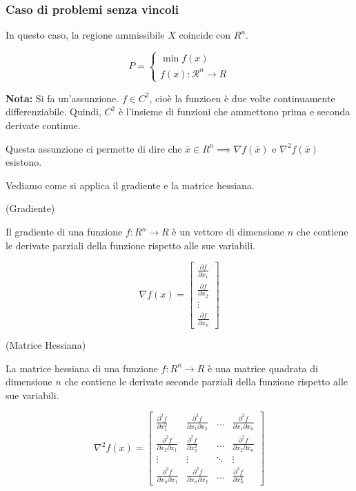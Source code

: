 \subsubsection{Caso di problemi senza vincoli}

In questo caso, la regione ammissibile $X$ coincide con $R^n$.

$$
    P = \begin{cases}
        \min f(x) \\
        f(x): \mathcal{R}^n \rightarrow R
    \end{cases}
$$

\textbf{Nota:} Si fa un'assunzione. $f \in C^2$, cioè la funzioen è due volte
continuamente differenziabile. Quindi, $C^2$ è l'insieme di funzioni che ammettono prima e seconda derivate continue.

Questa assunzione ci permette di dire che $\bar{x} \in R^n \implies \nabla f(\bar{x})$ e $\nabla^2 f(\bar{x})$ esistono.


Vediamo come si applica il gradiente e la matrice hessiana.

\begin{definition}
    (Gradiente)

    Il gradiente di una funzione $f: R^n \rightarrow R$ è un vettore di dimensione
    $n$ che contiene le derivate parziali della funzione rispetto alle sue
    variabili.

    $$
        \nabla f(x) = \begin{bmatrix}
            \frac{\partial f}{\partial x_1} \\
            \frac{\partial f}{\partial x_2} \\
            \vdots                             \\
            \frac{\partial f}{\partial x_n}
        \end{bmatrix}
    $$
\end{definition}

\begin{definition}
    (Matrice Hessiana)

    La matrice hessiana di una funzione $f: R^n \rightarrow R$ è una matrice
    quadrata di dimensione $n$ che contiene le derivate seconde parziali della
    funzione rispetto alle sue variabili.

    $$
        \nabla^2 f(x) = \begin{bmatrix}
            \frac{\partial^2 f}{\partial x_1^2} & \frac{\partial^2 f}{\partial x_1 \partial x_2} & \dots  & \frac{\partial^2 f}{\partial x_1 \partial x_n} \\
            \frac{\partial^2 f}{\partial x_2 \partial x_1} & \frac{\partial^2 f}{\partial x_2^2} & \dots  & \frac{\partial^2 f}{\partial x_2 \partial x_n} \\
            \vdots & \vdots & \ddots & \vdots \\
            \frac{\partial^2 f}{\partial x_n \partial x_1} & \frac{\partial^2 f}{\partial x_n \partial x_2} & \dots  & \frac{\partial^2 f}{\partial x_n^2}
        \end{bmatrix}
    $$
\end{definition}

